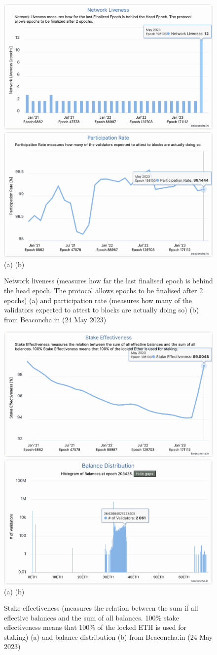\documentclass[UTF8]{article}
\begin{document}
{\begin{figure}[htbp]
\begin{center}
\includegraphics[width=0.48\linewidth]{images/bchart5}
\includegraphics[width=0.48\linewidth]{images/bchart6} \\
(a)\hspace{160pt}        (b)\\
\caption{Network liveness (measures how far the last finalised epoch is behind the head epoch. The protocol allows epochs to be finalised after 2 epochs) (a) and participation rate (measures how many of the validators expected to attest to blocks are actually doing so) (b) from Beaconcha.in (24 May 2023)}
\label{fig:chart5}
\end{center}
\end{figure}

\begin{figure}[htbp]
\begin{center}
\includegraphics[width=0.48\linewidth]{images/bchart7}
\includegraphics[width=0.48\linewidth]{images/bchart8} \\
(a)\hspace{160pt}        (b)\\
\caption{Stake effectiveness (measures the relation between the sum if all effective balances and the sum of all balances. 100\% stake effectiveness means that 100\% of the locked ETH is used for staking) (a) and balance distribution (b) from Beaconcha.in (24 May 2023)}
\label{fig:chart7}
\end{center}
\end{figure}

}
\end{document}
